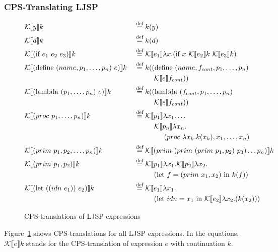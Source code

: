 \documentclass[11pt]{report}
\newcommand{\eqdef}{\stackrel{\text{def}}{=}}%
\newcommand{\cpstrans}[1]{\ensuremath{\mathcal{K}\llbracket #1 \rrbracket}}
\begin{document}
\subsubsection{CPS-Translating LJSP}
\begin{figure}[ht]
\begin{alignat*}{2}
&\cpstrans{y} k &&\eqdef k(y) \\
%
&\cpstrans{d} k &&\eqdef k(d) \\
%
&\cpstrans{(\text{if}\ e_1\ e_2\ e_3)} k &&\eqdef \cpstrans{e_1} \lambda x.(\text{if}\ x\ \cpstrans{e_2}k\ \cpstrans{e_3}k) \\
%
&\cpstrans{(\text{define}\ (name, p_1, \dots, p_n)\ e)} k &&\eqdef k((\text{define}\ (name, f_{cont}, p_1, \dots, p_n)\ \\
&&&\hspace{1cm}\cpstrans{e}f_{cont})) \\
%
&\cpstrans{(\text{lambda}\ (p_1, \dots, p_n)\ e)} k &&\eqdef k((\text{lambda}\ (f_{cont}, p_1, \dots, p_n)\ \\
&&&\hspace{1cm}\cpstrans{e}f_{cont})) \\
%
&\cpstrans{(proc\ p_1, \dots, p_n)} k &&\eqdef \cpstrans{p_1} \lambda x_1. \dots  \\
&&&\hspace{1 cm}\cpstrans{p_n} \lambda x_n.\\
&&&\hspace{1.5 cm}(proc\ \lambda x_k.k(x_k), x_1, \dots, x_n) \\
%
&\cpstrans{(prim\ p_1, p_2, \dots, p_n)} k &&\eqdef \cpstrans{(prim\ (prim\ (prim\ p_1, p_2)\ p_3) \dots p_n)} k\\
%
&\cpstrans{(prim\ p_1, p_2)} k &&\eqdef \cpstrans{p_1}\lambda x_1. \cpstrans{p_2}\lambda x_2.\\
&&&\hspace{1cm}(\text{let}\ f=(prim\ x_1, x_2)\ \text{in}\ k(f))\\
%
&\cpstrans{(\text{let}\ ((idn\ e_1))\ e_2)} k &&\eqdef \cpstrans{e_1} \lambda x_1. \\
&&&\hspace{1 cm}(\text{let}\ idn = x_1\ \text{in}\ \cpstrans{e_2} \lambda x_2.(k(x_2)))
\end{alignat*}
\caption{CPS-translations of LJSP expressions}
\label{cpstrans}
\end{figure}

Figure~\ref{cpstrans} shows CPS-translations for all LJSP expressions. In the equations, $\cpstrans{e} k$ stands for the CPS-translation of expression $e$ with continuation $k$.
\end{document}
